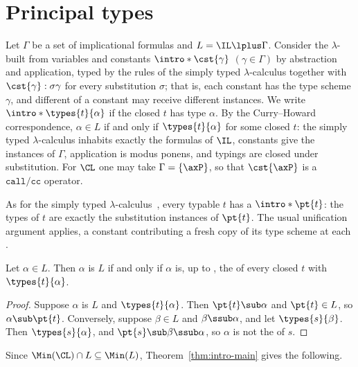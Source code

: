 \section{Principal types}\label{sec:principal}

Let $\Gamma$ be a set of implicational formulas and $L=\IL\lplus\Gamma$.
\AP Consider the $\lambda$- built from variables and constants
$\intro*\cst{\gamma}$ $(\gamma\in\Gamma)$ by abstraction and application,
typed by the rules of the simply typed $\lambda$-calculus together with
$\cst{\gamma}:\sigma\gamma$ for every substitution $\sigma$; that is, each
constant has the type scheme $\gamma$, and different  of a
constant may receive different instances. We write
$\intro*\types{t}{\alpha}$ if the closed  $t$ has type $\alpha$. By
the Curry--Howard correspondence, $\alpha\in L$ if and only if
$\types{t}{\alpha}$ for some closed  $t$: the simply typed
$\lambda$-calculus inhabits exactly the formulas of $\IL$, constants give the
instances of $\Gamma$, application is modus ponens, and typings are closed
under substitution. For $\CL$ one may take $\Gamma=\{\axP\}$, so that
$\cst{\axP}$ is a $\mathtt{call/cc}$ operator.

\AP As for the simply typed $\lambda$-calculus~\cite{Hin69}, every typable
 $t$ has a  $\intro*\pt{t}$: the types of $t$
are exactly the substitution instances of $\pt{t}$. The usual unification
argument applies, a constant contributing a fresh copy of its type scheme at
each .

\begin{proposition}\label{prop:principal}
Let $\alpha\in L$. Then $\alpha$ is  $L$ if and only if
$\alpha$ is, up to , the  of every closed
 $t$ with $\types{t}{\alpha}$.
\end{proposition}
\begin{proof}
Suppose $\alpha$ is  $L$ and $\types{t}{\alpha}$. Then
$\pt{t}\sub\alpha$ and $\pt{t}\in L$, so $\alpha\sub\pt{t}$. Conversely,
suppose $\beta\in L$ and $\beta\ssub\alpha$, and let $\types{s}{\beta}$.
Then $\types{s}{\alpha}$, and $\pt{s}\sub\beta\ssub\alpha$, so $\alpha$ is
not the  of $s$.
\end{proof}

Since $\Min(\CL)\cap L\subseteq\Min(L)$, Theorem~\ref{thm:intro-main}
gives the following.

